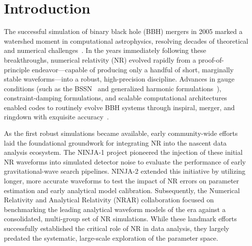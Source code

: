 \documentclass[%
 reprint,
superscriptaddress,
 amsmath,amssymb,
 aps,
]{revtex4-2}
\begin{document}





\section{Introduction}

The successful simulation of binary black hole (BBH) mergers in 2005 marked a watershed moment in computational astrophysics, resolving decades of theoretical and numerical challenges~\cite{Pretorius:2005gq, Campanelli:2005dd, Baker:2005vv, Szilagyi:2014fna, Lehner:2001wq, Arnowitt:1962hi, York:1971hw, Pretorius:2004jg, Shibata:1999hn}. In the years immediately following these breakthroughs, numerical relativity (NR) evolved rapidly from a proof-of-principle endeavor—capable of producing only a handful of short, marginally stable waveforms—into a robust, high-precision discipline. Advances in gauge conditions (such as the BSSN~\cite{Shibata:1995we, Baumgarte:1998te, Campanelli:2006fy} and generalized harmonic formulations~\cite{Alcubierre:2005gh, Pretorius:2007jn}), constraint-damping formulations, and scalable computational architectures~\cite{Loffler:2011ay, Bruegmann:2006ulg, Sperhake:2006cy, Bernuzzi:2009ex, Kidder:2016hev} enabled codes to routinely evolve BBH systems through inspiral, merger, and ringdown with exquisite accuracy~\cite{MacFadyen:1998vz, Ruffini:2009hg, Campanelli:2007cga, Gonzalez:2007hi}.

As the first robust simulations became available, early community-wide efforts laid the foundational groundwork for integrating NR into the nascent data analysis ecosystem. The NINJA-1 project \cite{Aylott:2009ya} pioneered the injection of these initial NR waveforms into simulated detector noise to evaluate the performance of early gravitational-wave search pipelines. NINJA-2 \cite{Ajith:2012az} extended this initiative by utilizing longer, more accurate waveforms to test the impact of NR errors on parameter estimation and early analytical model calibration. Subsequently, the Numerical Relativity and Analytical Relativity (NRAR) collaboration \cite{Hinder:2013oqa} focused on benchmarking the leading analytical waveform models of the era against a consolidated, multi-group set of NR simulations. While these landmark efforts successfully established the critical role of NR in data analysis, they largely predated the systematic, large-scale exploration of the parameter space.
\end{document}
